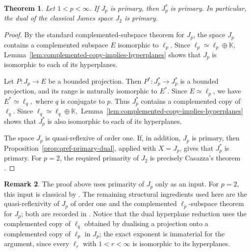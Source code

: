 \documentclass[11pt]{amsart}
\theoremstyle{plain}
\newtheorem{theorem}{Theorem}[section]
\theoremstyle{definition}
\newtheorem{remark}[theorem]{Remark}
\numberwithin{equation}{section}
\begin{document}
\begin{theorem}\label{thm:Jp-dual-primary}
Let $1<p<\infty$. If $J_p$ is primary, then $J_p^*$ is primary.
In particular, the dual of the classical James space $J_2$ is primary.
\end{theorem}

\begin{proof}
By the standard complemented-subspace theorem for $J_p$, the space $J_p$ contains a complemented subspace $E$ isomorphic to $\ell_p$. Since
\(
    \ell_p\simeq \ell_p\oplus\mathbb K,
\)
Lemma~\ref{lem:complemented-copy-implies-hyperplanes} shows that $J_p$ is isomorphic to each of its hyperplanes.

Let $P\colon J_p\to E$ be a bounded projection. Then $P^*\colon J_p^*\to J_p^*$ is a bounded projection, and its range is naturally isomorphic to $E^*$. Since $E\simeq\ell_p$, we have
\(
    E^*\simeq\ell_q,
\)
where $q$ is conjugate to $p$. Thus $J_p^*$ contains a complemented copy of $\ell_q$. Since
\(
    \ell_q\simeq\ell_q\oplus\mathbb K,
\)
Lemma~\ref{lem:complemented-copy-implies-hyperplanes} shows that $J_p^*$ is also isomorphic to each of its hyperplanes.

The space $J_p$ is quasi-reflexive of order one. If, in addition, $J_p$ is primary, then Proposition~\ref{prop:qref-primary-dual}, applied with $X=J_p$, gives that $J_p^*$ is primary.
For $p=2$, the required primarity of $J_2$ is precisely Casazza's theorem \cite{Casazza1977}.
\end{proof}

\begin{remark}\label{rem:Jp-dual-primary-literature}
The proof above uses primarity of $J_p$ only as an input. For $p=2$, this input is classical by \cite{Casazza1977}. The remaining structural ingredients used here are the quasi-reflexivity of $J_p$ of order one and the complemented $\ell_p$-subspace theorem for $J_p$; both are recorded in \cite[Remark~2.2, Proposition~2.3, and Section~2.6]{BirdLaustsen2010}. Notice that the dual hyperplane reduction uses the complemented copy of $\ell_q$ obtained by dualising a projection onto a complemented copy of $\ell_p$ in $J_p$; the exact exponent is immaterial for the argument, since every $\ell_r$ with $1<r<\infty$ is isomorphic to its hyperplanes.
\end{remark}
\end{document}
